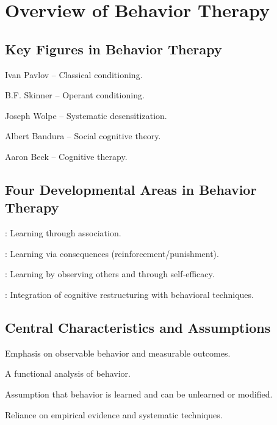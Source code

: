 \section{Overview of Behavior Therapy}

\subsection{Key Figures in Behavior Therapy}
\begin{coloredlist}
    \item Ivan Pavlov – Classical conditioning.
    \item B.F. Skinner – Operant conditioning.
    \item Joseph Wolpe – Systematic desensitization.
    \item Albert Bandura – Social cognitive theory.
    \item Aaron Beck – Cognitive therapy.
\end{coloredlist}

\subsection{Four Developmental Areas in Behavior Therapy}
\begin{coloredlist}
    \item {}: Learning through association.
    \item {}: Learning via consequences (reinforcement/punishment).
    \item {}: Learning by observing others and through self-efficacy.
    \item {}: Integration of cognitive restructuring with behavioral techniques.
\end{coloredlist}

\subsection{Central Characteristics and Assumptions}
\begin{coloredlist}
    \item Emphasis on observable behavior and measurable outcomes.
    \item A functional analysis of behavior.
    \item Assumption that behavior is learned and can be unlearned or modified.
    \item Reliance on empirical evidence and systematic techniques.
\end{coloredlist}

